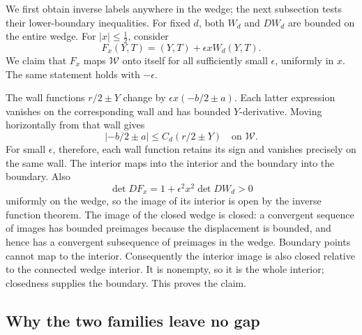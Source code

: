 We first obtain inverse labels anywhere in the wedge; the next
subsection tests their lower-boundary inequalities. For fixed $d$, both
$W_d$ and $DW_d$ are bounded on the entire wedge.
For $|x|\le\tfrac12$, consider
\[
 F_x(Y,T)=(Y,T)+\epsilon xW_d(Y,T).
\]
We claim that $F_x$ maps $\mathcal W$ onto itself for all sufficiently
small $\epsilon$, uniformly in $x$.  The same statement holds with
$-\epsilon$.

The wall functions $r/2\pm Y$ change by
$\epsilon x(-b/2\pm a)$.  Each latter expression vanishes on the
corresponding wall and has bounded $Y$-derivative.  Moving horizontally
from that wall gives
\[
 |-b/2\pm a|\le C_d(r/2\pm Y)\quad\text{on }\mathcal W.
\]
For small $\epsilon$, therefore, each wall function retains its sign
and vanishes precisely on the same wall.  The interior maps into the
interior and the boundary into the boundary.  Also
\[
 \det DF_x=1+\epsilon^2x^2\det DW_d>0
\]
uniformly on the wedge, so the image of its interior is open by the
inverse function theorem.  The image of the closed wedge is closed:
a convergent sequence of images has bounded preimages because the
displacement is bounded, and hence has a convergent subsequence of
preimages in the wedge.  Boundary points cannot map to the interior.
Consequently the interior image is also closed relative to the
connected wedge interior.  It is nonempty, so it is the whole interior;
closedness supplies the boundary.  This proves the claim.

\subsection{Why the two families leave no gap}
\label{c:rat-overlap}

